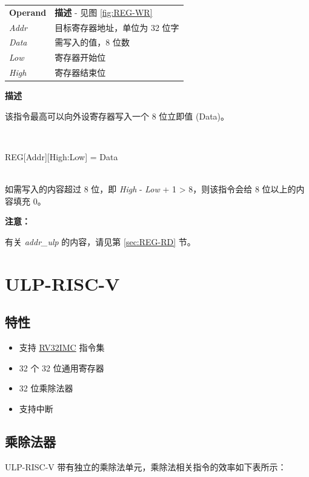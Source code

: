 \documentclass[main\_\_CN.tex]{subfiles}
\begin{document}
\vspace{-2em}
\begin{tabular}{ l l }
\textbf{Operand} & \textbf{描述} - 见图 \ref{fig:REG-WR} \\
\textit{Addr} & 目标寄存器地址，单位为 32 位字 \\
\textit{Data} & 需写入的值，8 位数 \\
\textit{Low} & 寄存器开始位 \\
\textit{High} & 寄存器结束位
\end{tabular}

\textbf{描述}

该指令最高可以向外设寄存器写入一个 8 位立即值 (Data)。

~
\begin{centering}
    REG[Addr][High:Low] = Data \\
\end{centering}
~\\
如需写入的内容超过 8 位，即 \textit{High} - \textit{Low} + 1 > 8，则该指令会给 8 位以上的内容填充 0。

\textbf{注意：}

有关 \textit{addr\_ulp} 的内容，请见第 \ref{sec:REG-RD} 节。

\section{ULP-RISC-V} \label{sec:PicoRV32}
\subsection{特性}
\begin{itemize}
    \item 支持 \href{https://riscv.org/specifications/}{RV32IMC} 指令集
    \item 32 个 32 位通用寄存器
    \item 32 位乘除法器
    \item 支持中断
\end{itemize}

\subsection{乘除法器}
ULP-RISC-V 带有独立的乘除法单元，乘除法相关指令的效率如下表所示：
\end{document}
